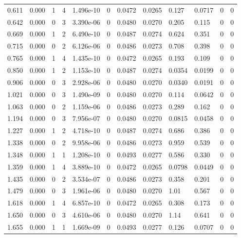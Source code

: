 \documentclass[preview]{standalone}
\begin{document}
{{\begin{tabular}{L{1.2cm}C{1.2cm} C{0.3cm}C{0.5cm} C{1.4cm}C{1.4cm} C{1.4cm}C{1.4cm} C{1.6cm}C{1.6cm} C{1.6cm}C{1.6cm}}
  0.611  &  0.000  & 1     &  4 &  1.496e-10  & 0  &  0.0472&   0.0265& 0.127 & 0.0717   &  0 & 0  \\ 
  0.642  &  0.000  & 0     &  3 &  3.390e-06  & 0  &  0.0480&   0.0270& 0.205 & 0.115   &  0 & 0  \\ 
  0.669  &  0.000  & 1     &  2 &  6.490e-10  & 0  &  0.0487&   0.0274& 0.624 & 0.351   &  0 & 0  \\ 
  0.715  &  0.000  & 0     &  2 &  6.126e-06  & 0  &  0.0486&   0.0273& 0.708 & 0.398   &  0 & 0  \\ 
  0.765  &  0.000  & 1     &  4 &  1.435e-10  & 0  &  0.0472&   0.0265& 0.193 & 0.109   &  0 & 0  \\ 
  0.850  &  0.000  & 1     &  2 &  1.153e-10  & 0  &  0.0487&   0.0274& 0.0354 & 0.0199   &  0 & 0  \\ 
  0.906  &  0.000  & 0     &  3 &  2.928e-06  & 0  &  0.0480&   0.0270& 0.0340 & 0.0191   &  0 & 0  \\ 
  1.021  &  0.000  & 0     &  3 &  1.490e-09  & 0  &  0.0480&   0.0270& 0.114 & 0.0642   &  0 & 0  \\ 
  1.063  &  0.000  & 0     &  2 &  1.159e-06  & 0  &  0.0486&   0.0273& 0.289 & 0.162   &  0 & 0  \\ 
  1.194  &  0.000  & 0     &  3 &  7.956e-07  & 0  &  0.0480&   0.0270& 0.0815 & 0.0458   &  0 & 0  \\ 
  1.227  &  0.000  & 1     &  2 &  4.718e-10  & 0  &  0.0487&   0.0274& 0.686 & 0.386   &  0 & 0  \\ 
  1.338  &  0.000  & 0     &  2 &  9.958e-06  & 0  &  0.0486&   0.0273& 0.959 & 0.539   &  0 & 0  \\ 
  1.348  &  0.000  & 1     &  1 &  1.208e-10  & 0  &  0.0493&   0.0277& 0.586 & 0.330   &  0 & 0  \\ 
  1.359  &  0.000  & 1     &  4 &  3.889e-10  & 0  &  0.0472&   0.0265& 0.0798 & 0.0449   &  0 & 0  \\ 
  1.435  &  0.000  & 0     &  2 &  3.534e-07  & 0  &  0.0486&   0.0273& 0.358 & 0.201   &  0 & 0  \\ 
  1.479  &  0.000  & 0     &  3 &  1.961e-06  & 0  &  0.0480&   0.0270& 1.01 & 0.567   &  0 & 0  \\ 
  1.618  &  0.000  & 1     &  4 &  6.857e-10  & 0  &  0.0472&   0.0265& 0.308 & 0.173   &  0 & 0  \\ 
  1.650  &  0.000  & 0     &  3 &  4.610e-06  & 0  &  0.0480&   0.0270& 1.14 & 0.641   &  0 & 0  \\ 
  1.655  &  0.000  & 1     &  1 &  1.669e-09  & 0  &  0.0493&   0.0277& 0.126 & 0.0707   &  0 & 0  \\ 

\end{tabular}}}
\end{document}
